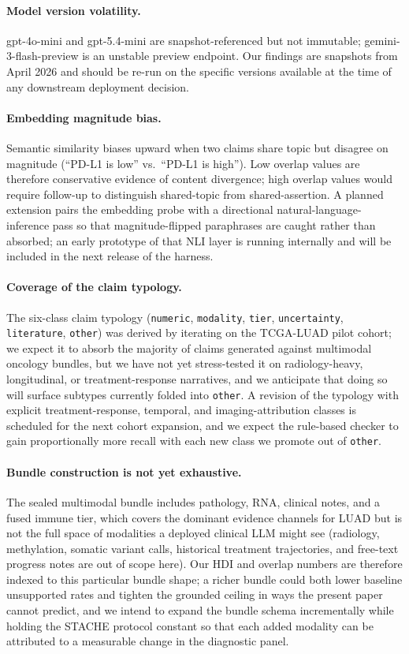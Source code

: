 \documentclass[11pt]{article}
\begin{document}
\paragraph{Model version volatility.} gpt-4o-mini and gpt-5.4-mini are snapshot-referenced but not immutable; gemini-3-flash-preview is an unstable preview endpoint. Our findings are snapshots from April 2026 and should be re-run on the specific versions available at the time of any downstream deployment decision.

\paragraph{Embedding magnitude bias.} Semantic similarity biases upward when two claims share topic but disagree on magnitude (``PD-L1 is low'' vs.\ ``PD-L1 is high''). Low overlap values are therefore conservative evidence of content divergence; high overlap values would require follow-up to distinguish shared-topic from shared-assertion. A planned extension pairs the embedding probe with a directional natural-language-inference pass so that magnitude-flipped paraphrases are caught rather than absorbed; an early prototype of that NLI layer is running internally and will be included in the next release of the harness.

\paragraph{Coverage of the claim typology.} The six-class claim typology (\texttt{numeric}, \texttt{modality}, \texttt{tier}, \texttt{uncertainty}, \texttt{literature}, \texttt{other}) was derived by iterating on the TCGA-LUAD pilot cohort; we expect it to absorb the majority of claims generated against multimodal oncology bundles, but we have not yet stress-tested it on radiology-heavy, longitudinal, or treatment-response narratives, and we anticipate that doing so will surface subtypes currently folded into \texttt{other}. A revision of the typology with explicit treatment-response, temporal, and imaging-attribution classes is scheduled for the next cohort expansion, and we expect the rule-based checker to gain proportionally more recall with each new class we promote out of \texttt{other}.

\paragraph{Bundle construction is not yet exhaustive.} The sealed multimodal bundle includes pathology, RNA, clinical notes, and a fused immune tier, which covers the dominant evidence channels for LUAD but is not the full space of modalities a deployed clinical LLM might see (radiology, methylation, somatic variant calls, historical treatment trajectories, and free-text progress notes are out of scope here). Our HDI and overlap numbers are therefore indexed to this particular bundle shape; a richer bundle could both lower baseline unsupported rates and tighten the grounded ceiling in ways the present paper cannot predict, and we intend to expand the bundle schema incrementally while holding the STACHE protocol constant so that each added modality can be attributed to a measurable change in the diagnostic panel.
\end{document}
